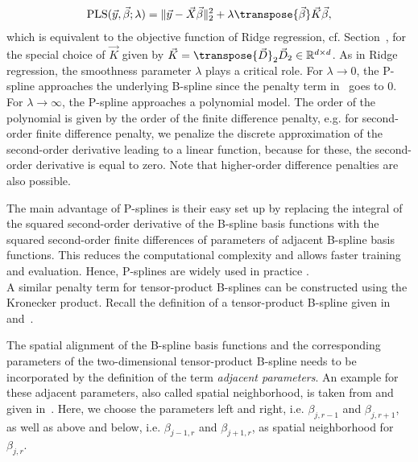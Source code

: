 \begin{align} \label{eq:P-spline-final-OF}
	\text{PLS}(\vec{y}, \vec{\beta}; \lambda) = \lVert \vec{y} - \vec{X} \vec{\beta} \rVert_2^2 + \lambda \transpose{\vec{\beta}} \vec{K} \vec{\beta},
\end{align}
%
which is equivalent to the objective function of Ridge regression, cf. Section~, for the special choice of $\vec{K}$ given by $\vec{K} = \transpose{\vec{D}}_2 \vec{D}_2 \in \mathbb{R}^{d \times d}$. As in Ridge regression, the smoothness parameter $\lambda$ plays a critical role. For $\lambda \rightarrow 0$, the P-spline approaches the underlying B-spline since the penalty term in~ goes to $0$. For $\lambda \rightarrow \infty$, the P-spline approaches a polynomial model. The order of the polynomial is given by the order of the finite difference penalty, e.g. for second-order finite difference penalty, we penalize the discrete approximation of the second-order derivative leading to a linear function, because for these, the second-order derivative is equal to zero. Note that higher-order difference penalties are also possible.

The main advantage of P-splines is their easy set up by replacing the integral of the squared second-order derivative of the B-spline basis functions with the squared second-order finite differences of parameters of adjacent B-spline basis functions. This reduces the computational complexity and allows faster training and evaluation. Hence, P-splines are widely used in practice \cite{eilers1996flexible}. \\

A similar penalty term for tensor-product B-splines can be constructed using the Kronecker product.  Recall the definition of a tensor-product B-spline given in~ and~.


The spatial alignment of the B-spline basis functions and the corresponding parameters of the two-dimensional tensor-product B-spline needs to be incorporated by the definition of the term \emph{adjacent parameters}. An example for these adjacent parameters, also called spatial neighborhood, is taken from \cite{fahrmeir2007regression} and given in~. Here, we choose the parameters left and right, i.e. $\beta_{j, r-1}$ and $\beta_{j, r+1}$, as well as above and below, i.e. $\beta_{j-1,r}$ and $\beta_{j+1, r}$, as spatial neighborhood for $\beta_{j,r}$. 

